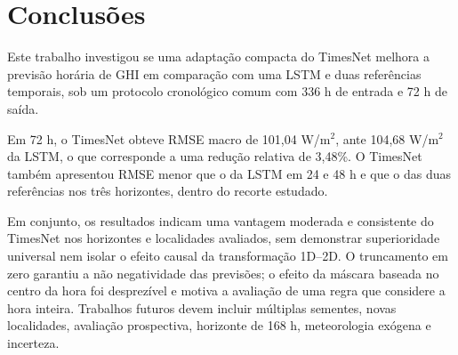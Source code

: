 \documentclass[10pt,conference,a4paper]{IEEEtran}
\begin{document}
\section{Conclusões}
\label{sec:conclusoes}

Este trabalho investigou se uma adaptação compacta do TimesNet melhora a
previsão horária de GHI em comparação com uma LSTM e duas referências
temporais, sob um protocolo cronológico comum com 336 h de entrada e 72 h de
saída.

Em 72 h, o TimesNet obteve RMSE macro de 101,04 W/m$^2$, ante 104,68 W/m$^2$
da LSTM, o que corresponde a uma redução relativa de 3,48\%. O TimesNet também
apresentou RMSE menor que o da LSTM em 24 e 48 h e que o das duas referências
nos três horizontes, dentro do recorte estudado.

Em conjunto, os resultados indicam uma vantagem moderada e consistente do
TimesNet nos horizontes e localidades avaliados, sem demonstrar superioridade
universal nem isolar o efeito causal da transformação 1D--2D. O truncamento em
zero garantiu a não negatividade das previsões; o efeito da máscara baseada no
centro da hora foi desprezível e motiva a avaliação de uma regra que considere
a hora inteira. Trabalhos futuros devem
incluir múltiplas sementes, novas localidades, avaliação prospectiva,
horizonte de 168 h, meteorologia exógena e incerteza.
\end{document}
